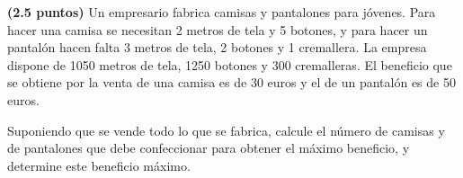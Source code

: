 
\textbf{(2.5 puntos)} Un empresario fabrica camisas y pantalones para jóvenes. Para hacer una camisa se necesitan 2 metros de tela y 5 botones, y para hacer un pantalón hacen falta 3 metros de tela, 2 botones y 1 cremallera. La empresa dispone de 1050 metros de tela, 1250 botones y 300 cremalleras. El beneficio que se obtiene por la venta de una camisa es de 30 euros y el de un pantalón es de 50 euros.

Suponiendo que se vende todo lo que se fabrica, calcule el número de camisas y de pantalones que debe confeccionar para obtener el máximo beneficio, y determine este beneficio máximo.
